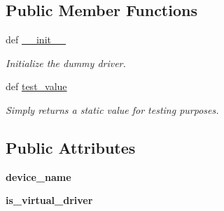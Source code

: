\subsection*{Public Member Functions}
\begin{DoxyCompactItemize}
\item 
def \hyperlink{classhwm_1_1hardware_1_1devices_1_1drivers_1_1test__virtual__driver_1_1test__virtual__driver_1_1_test___virtual___driver_add0d87a04c96c93b213fdbd5b74341f0}{\-\_\-\-\_\-init\-\_\-\-\_\-}
\begin{DoxyCompactList}\small\item\em Initialize the dummy driver. \end{DoxyCompactList}\item 
\hypertarget{classhwm_1_1hardware_1_1devices_1_1drivers_1_1test__virtual__driver_1_1test__virtual__driver_1_1_test___virtual___driver_a7003c9f2b6d27d50b560dace532abdf9}{def \hyperlink{classhwm_1_1hardware_1_1devices_1_1drivers_1_1test__virtual__driver_1_1test__virtual__driver_1_1_test___virtual___driver_a7003c9f2b6d27d50b560dace532abdf9}{test\-\_\-value}}\label{classhwm_1_1hardware_1_1devices_1_1drivers_1_1test__virtual__driver_1_1test__virtual__driver_1_1_test___virtual___driver_a7003c9f2b6d27d50b560dace532abdf9}

\begin{DoxyCompactList}\small\item\em Simply returns a static value for testing purposes. \end{DoxyCompactList}\end{DoxyCompactItemize}
\subsection*{Public Attributes}
\begin{DoxyCompactItemize}
\item 
\hypertarget{classhwm_1_1hardware_1_1devices_1_1drivers_1_1test__virtual__driver_1_1test__virtual__driver_1_1_test___virtual___driver_ad874f18c691320e4e21a9314b1607731}{{\bfseries device\-\_\-name}}\label{classhwm_1_1hardware_1_1devices_1_1drivers_1_1test__virtual__driver_1_1test__virtual__driver_1_1_test___virtual___driver_ad874f18c691320e4e21a9314b1607731}

\item 
\hypertarget{classhwm_1_1hardware_1_1devices_1_1drivers_1_1test__virtual__driver_1_1test__virtual__driver_1_1_test___virtual___driver_aecf4d6c6e16939a03ef229c1d96dc093}{{\bfseries is\-\_\-virtual\-\_\-driver}}\label{classhwm_1_1hardware_1_1devices_1_1drivers_1_1test__virtual__driver_1_1test__virtual__driver_1_1_test___virtual___driver_aecf4d6c6e16939a03ef229c1d96dc093}

\end{DoxyCompactItemize}


